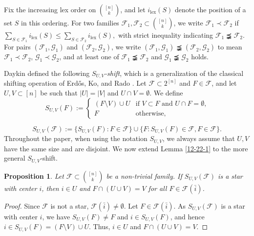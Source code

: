 \documentclass[a4paper,11pt]{article}
\newtheorem{proposition}[theorem]{Proposition}
\newcommand{\m}{\mathcal}
\begin{document}
Fix the increasing lex order on $\binom{[n]}{k}$, and let $i_{\text{lex}}(S)$ denote the position of a set $S$ in this ordering. For two families $\mathcal{F}_1, \mathcal{F}_2 \subset \binom{[n]}{k}$, we write 
$\mathcal{F}_1 \prec \mathcal{F}_2$ if 
$
\sum_{S \in \mathcal{F}_1} i_{\text{lex}}(S) \leq \sum_{S \in \mathcal{F}_2} i_{\text{lex}}(S),
$
with strict inequality indicating $\mathcal{F}_1 \precneqq \mathcal{F}_2$.
For pairs $(\mathcal{F}_1, \mathcal{G}_1)$ and  $(\mathcal{F}_2, \mathcal{G}_2)$, we write $(\mathcal{F}_1, \mathcal{G}_1) \precneqq  (\mathcal{F}_2, \mathcal{G}_2)$ to mean $\mathcal{F}_1 \prec \mathcal{F}_2$, $\mathcal{G}_1 \prec \mathcal{G}_2$, and at least one of $\mathcal{F}_1 \precneqq \mathcal{F}_2$ and  $\mathcal{G}_1 \precneqq \mathcal{G}_2$ holds.



Daykin \cite{Daykin1974} defined the following {\it $S_{U,V}$-shift}, which is a generalization of the classical shifting operation of Erd\H{o}s, Ko, and Rado \cite{EKR1961}. 
Let $\m F\subset 2^{[n]}$ and $F\in \m F$, and 
let $U,V\subset [n]$ be such that $|U|=|V|$ and $U\cap V=\emptyset$. 
We define 
\[ S_{U,V}(F):= 
\begin{cases}
    (F\setminus V) \cup U & \text{if $V\subset F$ and $U\cap F=\emptyset$,}\\
    F & \text{otherwise,}
\end{cases}\]

\[
S_{U,V}(\m F):=\{S_{U,V}(F): F\in \m F\}\cup \{F: S_{U,V}(F)\in \m F, F\in \m F\}.
\]
Throughout the paper, when using the notation $S_{U,V}$, we always assume that $U,V$ have the same size and are disjoint.
We now extend Lemma \ref{12-22-1} to the more general $S_{U,V}$-shift.
\begin{proposition}\label{1-21-2}
Let $\m F\subset {[n]\choose k}$ be a non-trivial family. If $S_{U,V}(\m F)$ is a star with center $i$, then $i\in U$ and $F\cap (U\cup V)=V$ for all $F\in \m F(\bar{i})$.
\end{proposition}

\begin{proof}
Since $\m F$ is not a star, $\m F(\bar{i})\ne \emptyset$.
Let $F\in \m F(\bar{i})$. 
As $S_{U,V}(\m F)$ is a star with center $i$, we have $S_{U,V}(F) \ne F$ and $i\in S_{U,V}(F)$,
 and hence
$i\in S_{U,V}(F)=(F\setminus V) \cup U$. 
Thus, $i\in U$ and $F\cap (U\cup V)=V$.
\end{proof}
\end{document}
